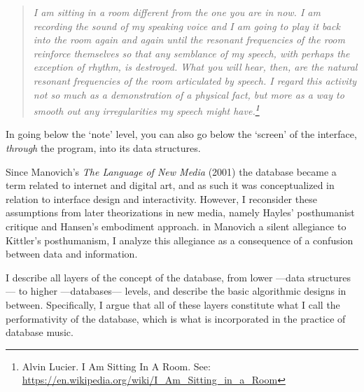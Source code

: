 
\begin{quote}
\footnotesize
\flushright
\raggedleft
\textit {
	I am sitting in a room different from the one you are in now. I am recording the sound of my speaking voice and I am going to play it back into the room again and again until the resonant frequencies of the room reinforce themselves so that any semblance of my speech, with perhaps the exception of rhythm, is destroyed. What you will hear, then, are the natural resonant frequencies of the room articulated by speech. I regard this activity not so much as a demonstration of a physical fact, but more as a way to smooth out any irregularities my speech might have.\footnote{Alvin Lucier. I Am Sitting In A Room. See: \url{https://en.wikipedia.org/wiki/I_Am_Sitting_in_a_Room}}
}
\end{quote}


In going below the `note' level, you can also go below the `screen' of the interface, \textit{through} the program, into its data structures.








Since Manovich's \textit{The Language of New Media} (2001) the database became a term related to internet and digital art, and as such it was conceptualized in relation to interface design and interactivity. However, I reconsider these assumptions from later theorizations in new media, namely Hayles' posthumanist critique and Hansen's embodiment approach. in Manovich a silent allegiance to Kittler's posthumanism, I analyze this allegiance as a consequence of a confusion between data and information.  



I describe all layers of the concept of the database, from lower ---data structures--- to higher ---databases--- levels, and describe the basic algorithmic designs in between. Specifically, I argue that all of these layers constitute what I call the performativity of the database, which is what is incorporated in the practice of database music.




